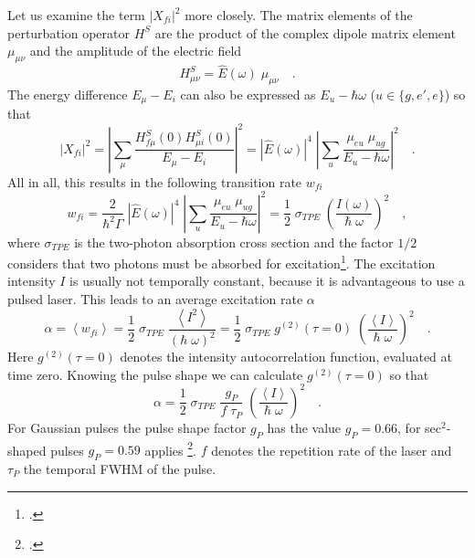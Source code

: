 Let us examine the term $|X_{fi}|^2$  more closely. The
matrix elements of the perturbation operator $H^S$ are the product of the
complex dipole matrix element $\mu_{\mu \nu}$ and the amplitude of the electric field
\begin{equation}
  H^S_{\mu \nu} = \hat{E}(\omega) \; \mu_{\mu \nu} \quad .
\end{equation}
The energy difference $E_\mu - E_i$ can also be expressed as $E_u - \hbar
\omega$ ($u \in \{g, e', e \}$) so that
\begin{equation}
|X_{fi}|^2 = \left| \sum_{\mu} \frac{H^S_{f \mu} (0) H^S_{\mu i}
(0)}{E_{\mu} - E_i} \right|^2 = \left| \hat{E}(\omega) \right|^4
\;  \left| \sum_{u} \frac{\mu_{e u} \; \mu_{u g}}{E_{u} - \hbar
\omega} \right|^2 \quad .
\end{equation}
All in all, this results in the following transition rate $w_{fi}$ 
\begin{equation}
w_{fi} =  \frac{2}{\hbar^2 \Gamma} \; \left| \hat{E}(\omega) \right|^4  \; \left|
\sum_{u} \frac{\mu_{e u} \; \mu_{u g}}{E_{u} - \hbar \omega}
\right|^2 = \frac{1}{2} \; \sigma_{TPE} \;
\left(\frac{I(\omega)}{\hbar \; \omega}\right)^2 \quad ,
\label{gl_theo_nlo_tpe_uebergansgrate}
\end{equation}
where $\sigma_{TPE}$ is the two-photon absorption cross section
and the factor $1/2$ considers that two photons
must be absorbed for excitation\footcite{xu97}. The
excitation intensity $I$ is  usually not temporally
constant, because it is advantageous to use a pulsed laser. This leads to an average excitation rate $\alpha$
\begin{equation}
  \alpha = \left< w_{fi} \right> =
  \frac{1}{2} \; \sigma_{TPE} \; \frac{ \left<I^2 \right>}{(\hbar \; \omega)^2}
  = \frac{1}{2} \; \sigma_{TPE} \; g^{(2)}(\tau = 0) \;
  \left(\frac{\left< I \right>}{\hbar \; \omega}\right)^2 \quad .
\end{equation}
Here $g^{(2)}(\tau = 0)$ denotes the 
intensity autocorrelation function, evaluated at  time zero. 
Knowing the pulse shape we can calculate 
 $g^{(2)}(\tau
= 0)$ so that
\begin{equation}
  \alpha
  = \frac{1}{2} \; \sigma_{TPE} \; \frac{g_P}{f \; \tau_P} \;
  \left(\frac{\left< I \right>}{\hbar \; \omega}\right)^2 \quad .
\end{equation}
For Gaussian pulses the pulse shape factor $g_P$ has the value
$g_P = 0.66$, for sec$^2$-shaped pulses $g_P = 0.59$ applies
\footcite{xu97}. $f$ denotes the repetition rate of the laser and
$\tau_P$ the temporal FWHM of the pulse. 

